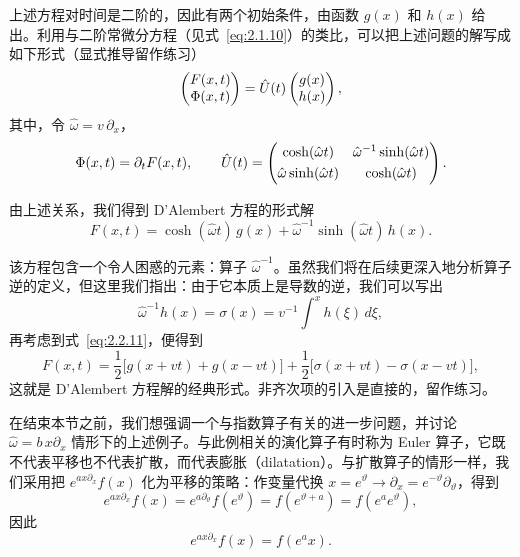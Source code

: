 上述方程对时间是二阶的，因此有两个初始条件，由函数 $g(x)$ 和 $h(x)$ 给出。利用与二阶常微分方程（见式~\eqref{eq:2.1.10}）的类比，可以把上述问题的解写成如下形式（显式推导留作练习）
\begin{equation}
\begin{pmatrix}F(x,t)\\\Phi(x,t)\end{pmatrix}=\hat{U}(t)\begin{pmatrix}g(x)\\h(x)\end{pmatrix},
\label{eq:2.3.2}
\end{equation}
其中，令 $\hat{\omega}=v\,\partial_{x}$，
\begin{equation}
\Phi(x,t)=\partial_{t}F(x,t),\qquad
\hat{U}(t)=
\begin{pmatrix}\cosh(\hat{\omega}t)&\hat{\omega}^{-1}\sinh(\hat{\omega}t)\\[1mm]
\hat{\omega}\sinh(\hat{\omega}t)&\cosh(\hat{\omega}t)\end{pmatrix}.
\label{eq:2.3.3}
\end{equation}

由上述关系，我们得到 D'Alembert 方程的形式解
\begin{equation}
F(x,t)=\cosh(\hat{\omega}t)\,g(x)
+\hat{\omega}^{-1}\sinh(\hat{\omega}t)\,h(x).
\label{eq:2.3.4}
\end{equation}

该方程包含一个令人困惑的元素：算子 $\hat{\omega}^{-1}$。虽然我们将在后续更深入地分析算子逆的定义，但这里我们指出：由于它本质上是导数的逆，我们可以写出
\begin{equation}
\hat{\omega}^{-1}h(x)=\sigma(x)=v^{-1}\int^{x}h(\xi)\,d\xi,
\label{eq:2.3.5}
\end{equation}
再考虑到式~\eqref{eq:2.2.11}，便得到
\begin{equation}
F(x,t)=\frac{1}{2}\bigl[g(x+v t)+g(x-v t)\bigr]
+\frac{1}{2}\bigl[\sigma(x+v t)-\sigma(x-v t)\bigr],
\label{eq:2.3.6}
\end{equation}
这就是 D'Alembert 方程解的经典形式。非齐次项的引入是直接的，留作练习。

在结束本节之前，我们想强调一个与指数算子有关的进一步问题，并讨论 $\hat{\omega}=b\,x\partial_{x}$ 情形下的上述例子。与此例相关的演化算子有时称为 Euler 算子，它既不代表平移也不代表扩散，而代表膨胀（dilatation）。与扩散算子的情形一样，我们采用把 $e^{a x\partial_{x}}f(x)$ 化为平移的策略：作变量代换 $x=e^{\vartheta}\rightarrow\partial_{x}=e^{-\vartheta}\partial_{\vartheta}$，得到
\begin{equation}
e^{a x\partial_{x}}f(x)=e^{a\partial_{\vartheta}}f(e^{\vartheta})
=f(e^{\vartheta+a})=f(e^{a}e^{\vartheta}),
\label{eq:2.3.7}
\end{equation}
因此
\begin{equation}
e^{a x\partial_{x}}f(x)=f(e^{a}x).
\label{eq:2.3.8}
\end{equation}

